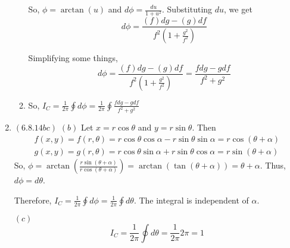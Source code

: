 \documentclass[12pt]{article}
\begin{document}
\begin{enumerate}[start=1,label={\bfseries Problem \arabic*:},leftmargin=1in]
\begin{enumerate}
        So, $\phi = \arctan(u)$ and $d\phi = \frac{du}{1 + u^{2}}$. 
        Substituting $du$, we get 
         \[
         d\phi = \frac{(f)dg - (g)df}{f^{2}(1 + \frac{g^{2}}{f^{2}})} 
         \]

         Simplifying some things, 
         \[ 
            d\phi = \frac{(f)dg - (g)df}{f^{2}(1 + \frac{g^{2}}{f^{2}})} = \frac{fdg - gdf}{f^{2}+g^{2}}
         \]

         \item So, $I_{C} = \frac{1}{2\pi} \oint d\phi = \frac{1}{2\pi} \oint \frac{fdg - gdf}{f^{2}+g^{2}}$ 
    \end{enumerate} 
    
    \item $(6.8.14bc)$
    $(b)$ 
    Let $x = r\cos \theta$ and $y = r\sin \theta$. Then 
    \begin{align*}
        f(x, y) = f(r, \theta) = r\cos\theta\cos \alpha -r\sin\theta \sin \alpha = r\cos(\theta + \alpha)\\
        g(x, y) = g(r, \theta) = r\cos\theta\sin \alpha +r\sin\theta \cos\alpha  = r\sin(\theta + \alpha )
    \end{align*}
    So, $\phi = \arctan(\frac{r\sin(\theta + \alpha)}{r\cos(\theta + \alpha)}) = \arctan(\tan(\theta + \alpha)) = \theta + \alpha$. Thus, $d\phi = d\theta$. 

    Therefore, $I_{C} = \frac{1}{2\pi} \oint d\phi = \frac{1}{2\pi} \oint d\theta$. The integral is independent of $\alpha$. 
    
    
    $(c)$ 
    \[
        I_{C} = \frac{1}{2\pi} \oint d\theta = \frac{1}{2\pi} 2\pi = 1
     \]
\end{enumerate}
\end{document}
